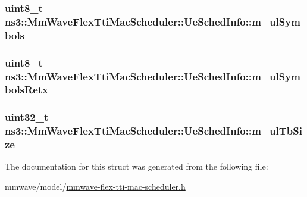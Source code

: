\subsubsection[{\texorpdfstring{m\+\_\+ul\+Symbols}{m_ulSymbols}}]{\setlength{\rightskip}{0pt plus 5cm}uint8\+\_\+t ns3\+::\+Mm\+Wave\+Flex\+Tti\+Mac\+Scheduler\+::\+Ue\+Sched\+Info\+::m\+\_\+ul\+Symbols}\hypertarget{structns3_1_1MmWaveFlexTtiMacScheduler_1_1UeSchedInfo_ae161e145047db427109bffd092fba99e}{}\label{structns3_1_1MmWaveFlexTtiMacScheduler_1_1UeSchedInfo_ae161e145047db427109bffd092fba99e}
\subsubsection[{\texorpdfstring{m\+\_\+ul\+Symbols\+Retx}{m_ulSymbolsRetx}}]{\setlength{\rightskip}{0pt plus 5cm}uint8\+\_\+t ns3\+::\+Mm\+Wave\+Flex\+Tti\+Mac\+Scheduler\+::\+Ue\+Sched\+Info\+::m\+\_\+ul\+Symbols\+Retx}\hypertarget{structns3_1_1MmWaveFlexTtiMacScheduler_1_1UeSchedInfo_ac7a566008965f549c346852efdeabd48}{}\label{structns3_1_1MmWaveFlexTtiMacScheduler_1_1UeSchedInfo_ac7a566008965f549c346852efdeabd48}
\subsubsection[{\texorpdfstring{m\+\_\+ul\+Tb\+Size}{m_ulTbSize}}]{\setlength{\rightskip}{0pt plus 5cm}uint32\+\_\+t ns3\+::\+Mm\+Wave\+Flex\+Tti\+Mac\+Scheduler\+::\+Ue\+Sched\+Info\+::m\+\_\+ul\+Tb\+Size}\hypertarget{structns3_1_1MmWaveFlexTtiMacScheduler_1_1UeSchedInfo_a225203cbc3b2acc36c990e7b1b664833}{}\label{structns3_1_1MmWaveFlexTtiMacScheduler_1_1UeSchedInfo_a225203cbc3b2acc36c990e7b1b664833}


The documentation for this struct was generated from the following file\+:\begin{DoxyCompactItemize}
\item 
mmwave/model/\hyperlink{mmwave-flex-tti-mac-scheduler_8h}{mmwave-\/flex-\/tti-\/mac-\/scheduler.\+h}\end{DoxyCompactItemize}
